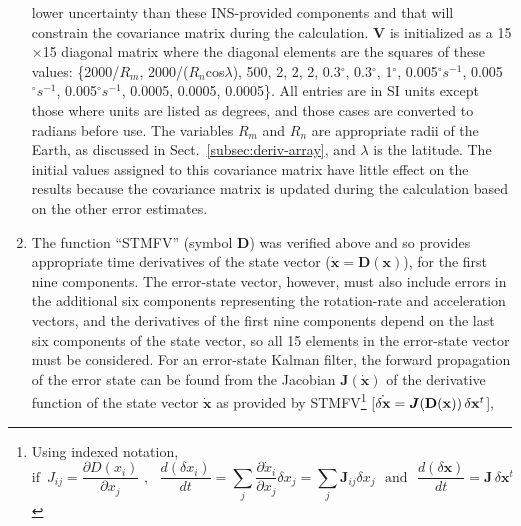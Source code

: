 \documentclass[12pt,twoside,english,12pt,twoside,english]{article}\usepackage[]{graphicx}\usepackage[]{color}
\let\OrgIndex\index
\renewcommand*{\index}[1]{\OrgIndex{#1}}
\begin{document}
\begin{enumerate}
lower uncertainty than
these INS-provided components and that will constrain the covariance
matrix during the calculation. $\mathbf{V}$ is initialized as a 15$\times$15
diagonal matrix where the diagonal elements are the squares of these
values: \{2000/$R_{m}$, 2000/($R_{n}$cos$\lambda$), 500, 2, 2,
2, 0.3$^{\circ}$, 0.3$^{\circ}$, 1$^{\circ}$, 0.005$^{\circ}s^{-1}$,
0.005$^{\circ}s^{-1}$, 0.005$^{\circ}s^{-1}$, 0.0005, 0.0005, 0.0005\}.
All entries are in SI units except those where units are listed as
degrees, and those cases are converted to radians before use. The
variables $R_{m}$ and $R_{n}$ are appropriate radii of the Earth,
as discussed in Sect.~\ref{subsec:deriv-array}, and $\lambda$ is
the latitude. The initial values assigned to this
covariance matrix have little effect on the results because the covariance
matrix is updated during the calculation based on the other error
estimates.
\item The function ``STMFV'' (symbol $\mathbf{D}$)
was verified above and so provides appropriate time derivatives
of the state vector ($\dot{\mathbf{x}}=\mathbf{D}(\mathbf{x})$),
for the first nine components. The error-state vector,
however, must also include errors in the additional six components
representing the rotation-rate and acceleration
vectors, and the derivatives of the first nine components depend on
the last six components of the state vector, so all 15 elements in
the error-state vector must be considered. For an error-state Kalman
filter, the forward propagation of the error state
can be found from the Jacobian
$\mathbf{J}(\dot{\mathbf{x}})$ of the derivative function of the
state vector $\dot{\boldsymbol{x}}$ as provided by STMFV\footnote{Using indexed notation,\\
\[
\mathrm{if}\,\,\,J_{ij}=\frac{\partial D(x_{i})}{\partial x_{j}}\,\,,\,\,\,\,\frac{d(\delta x_{i})}{dt}=\sum_{j}\frac{\partial\dot{x}_{i}}{\partial x_{j}}\delta x_{j}=\sum_{j}\boldsymbol{J}_{ij}\delta x_{j}\,\,\,\,\mathrm{and}\,\,\,\,\frac{d(\delta\mathbf{x})}{dt}=\mathbf{J}\,\delta\mathbf{x}{}^{t}
\]
} {[}$\dot{\delta\mathbf{x}}=\boldsymbol{J}(\mathbf{D}(\mathbf{x}))\thinspace\delta\mathbf{x}^{t}${]},

\end{enumerate}
\end{document}

